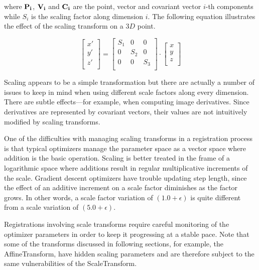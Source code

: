 where $\bf{P}_i$, $\bf{V}_i$ and $\bf{C}_i$ are the point, vector and covariant
vector $i$-th components while $S_i$ is the scaling factor along dimension $i$.
The following equation illustrates the effect of the scaling transform on a
$3D$ point.

\begin{equation}
\left[ 
\begin{array}{c}
x' \\
y' \\
z' \\
\end{array}
\right]
=
\left[ 
\begin{array}{ccc}
S_1 &  0  &  0  \\
 0  & S_2 &  0  \\
 0  &  0  & S_3 \\
\end{array}
\right]
\cdot
\left[ 
\begin{array}{c}
x  \\
y  \\
z  \\
\end{array}
\right]
\end{equation}

Scaling appears to be a simple transformation but there are actually a
number of issues to keep in mind when using different scale factors along
every dimension. There are subtle effects---for example, when computing image
derivatives. Since derivatives are represented by covariant vectors, their
values are not intuitively modified by scaling transforms.

One of the difficulties with managing scaling transforms in a registration
process is that typical optimizers manage the parameter space as a vector
space where addition is the basic operation. Scaling is better treated in the
frame of a logarithmic space where additions result in regular multiplicative
increments of the scale. Gradient descent optimizers have trouble updating
step length, since the effect of an additive increment on a scale factor
diminishes as the factor grows. In other words, a scale factor variation of
$(1.0+ \epsilon)$ is quite different from a scale variation of
$(5.0+\epsilon)$.

Registrations involving scale transforms require careful monitoring of the
optimizer parameters in order to keep it progressing at a stable pace. Note
that some of the transforms discussed in following sections, for example, the
AffineTransform, have hidden scaling parameters and are therefore
subject to the same vulnerabilities of the ScaleTransform.

